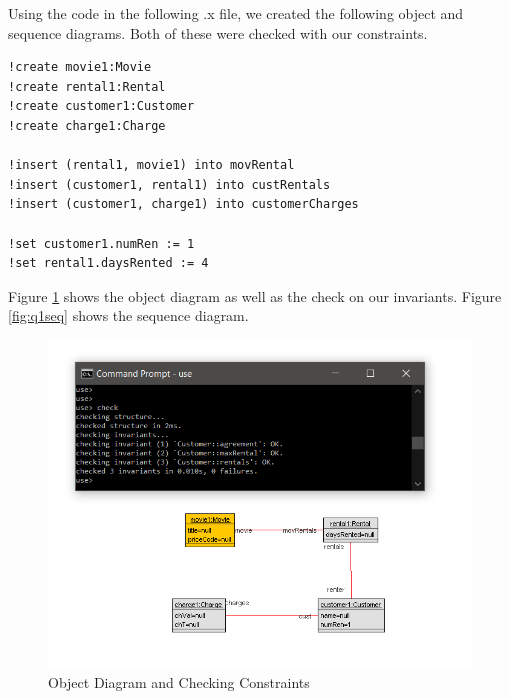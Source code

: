\documentclass{article}
\begin{document}
	\noindent
	Using the code in the following .x file, we created the following object and sequence diagrams. Both of these were checked with our constraints.
\begin{Verbatim}
!create movie1:Movie
!create rental1:Rental
!create customer1:Customer
!create charge1:Charge

!insert (rental1, movie1) into movRental
!insert (customer1, rental1) into custRentals
!insert (customer1, charge1) into customerCharges

!set customer1.numRen := 1
!set rental1.daysRented := 4
\end{Verbatim}
	\newpage
	\noindent
	Figure \ref{fig:q1obj} shows the object diagram as well as the check on our invariants. Figure \ref{fig:q1seq} shows the sequence diagram.
	\begin{figure}[h]
		\includegraphics[width=\linewidth]{Q1ObjPNG.PNG}
		\caption{Object Diagram and Checking Constraints}
		\label{fig:q1obj}
	\end{figure}
	\newpage
\end{document}
